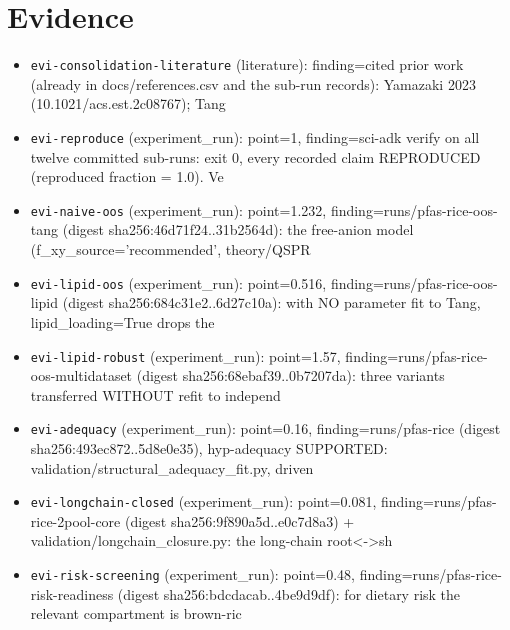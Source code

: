 \documentclass{article}
\begin{document}
\section{Evidence}
\begin{itemize}
  \item \texttt{evi-consolidation-literature} (literature): finding=cited prior work (already in docs/references.csv and the sub-run records): Yamazaki 2023 (10.1021/acs.est.2c08767); Tang
  \item \texttt{evi-reproduce} (experiment\_run): point=1, finding=sci-adk verify on all twelve committed sub-runs: exit 0, every recorded claim REPRODUCED (reproduced fraction = 1.0). Ve
  \item \texttt{evi-naive-oos} (experiment\_run): point=1.232, finding=runs/pfas-rice-oos-tang (digest sha256:46d71f24..31b2564d): the free-anion model (f\_xy\_source='recommended', theory/QSPR
  \item \texttt{evi-lipid-oos} (experiment\_run): point=0.516, finding=runs/pfas-rice-oos-lipid (digest sha256:684c31e2..6d27c10a): with NO parameter fit to Tang, lipid\_loading=True drops the
  \item \texttt{evi-lipid-robust} (experiment\_run): point=1.57, finding=runs/pfas-rice-oos-multidataset (digest sha256:68ebaf39..0b7207da): three variants transferred WITHOUT refit to independ
  \item \texttt{evi-adequacy} (experiment\_run): point=0.16, finding=runs/pfas-rice (digest sha256:493ec872..5d8e0e35), hyp-adequacy SUPPORTED: validation/structural\_adequacy\_fit.py, driven
  \item \texttt{evi-longchain-closed} (experiment\_run): point=0.081, finding=runs/pfas-rice-2pool-core (digest sha256:9f890a5d..e0c7d8a3) + validation/longchain\_closure.py: the long-chain root<->sh
  \item \texttt{evi-risk-screening} (experiment\_run): point=0.48, finding=runs/pfas-rice-risk-readiness (digest sha256:bdcdacab..4be9d9df): for dietary risk the relevant compartment is brown-ric
\end{itemize}
\end{document}
